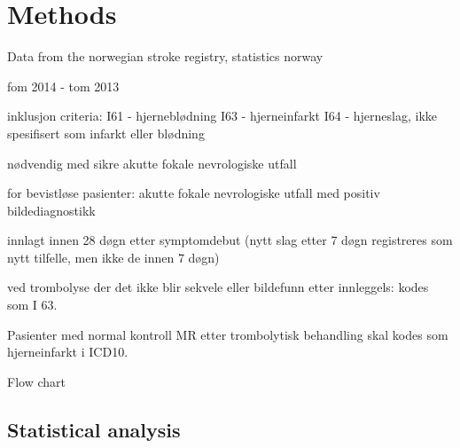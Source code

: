 \section{Methods}

Data from the norwegian stroke registry, statistics norway

fom 2014 - tom 2013

inklusjon criteria: I61 - hjerneblødning I63 - hjerneinfarkt I64 - hjerneslag,
ikke spesifisert som infarkt eller blødning

nødvendig med sikre akutte fokale nevrologiske utfall

for bevistløse pasienter: akutte fokale nevrologiske utfall med positiv
bildediagnostikk

innlagt innen 28 døgn etter symptomdebut (nytt slag etter 7 døgn registreres
som nytt tilfelle, men ikke de innen 7 døgn)

ved trombolyse der det ikke blir sekvele eller bildefunn etter innleggels:
kodes som I 63.

Pasienter med normal kontroll MR etter trombolytisk behandling skal kodes som
hjerneinfarkt i ICD10.

Flow chart


\subsection{Statistical analysis}
